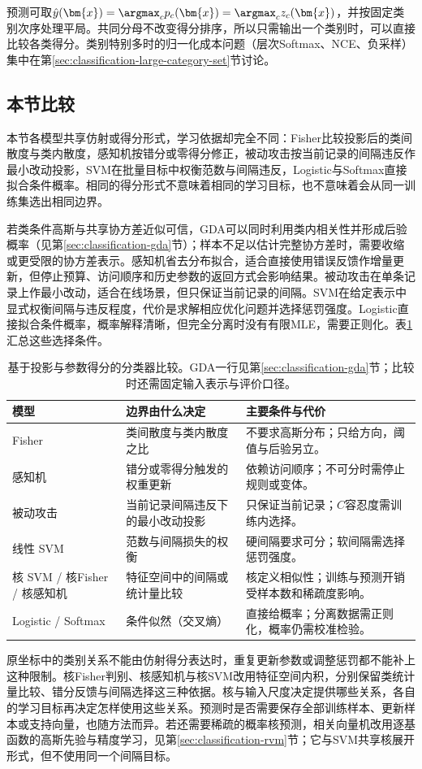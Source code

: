 预测可取$\hat y(\bm{x})=\argmax_c p_c(\bm{x})=\argmax_c z_c(\bm{x})$，并按固定类别次序处理平局。共同分母不改变得分排序，所以只需输出一个类别时，可以直接比较各类得分。类别特别多时的归一化成本问题（层次Softmax、NCE、负采样）集中在第\ref{sec:classification-large-category-set}节讨论。

\subsection{本节比较}
\label{sec:classification-linear-comparison}

本节各模型共享仿射或得分形式，学习依据却完全不同：Fisher比较投影后的类间散度与类内散度，感知机按错分或零得分修正，被动攻击按当前记录的间隔违反作最小改动投影，SVM在批量目标中权衡范数与间隔违反，Logistic与Softmax直接拟合条件概率。相同的得分形式不意味着相同的学习目标，也不意味着会从同一训练集选出相同边界。

若类条件高斯与共享协方差近似可信，GDA可以同时利用类内相关性并形成后验概率（见第\ref{sec:classification-gda}节）；样本不足以估计完整协方差时，需要收缩或更受限的协方差表示。感知机省去分布拟合，适合直接使用错误反馈作增量更新，但停止预算、访问顺序和历史参数的返回方式会影响结果。被动攻击在单条记录上作最小改动，适合在线场景，但只保证当前记录的间隔。SVM在给定表示中显式权衡间隔与违反程度，代价是求解相应优化问题并选择惩罚强度。Logistic直接拟合条件概率，概率解释清晰，但完全分离时没有有限MLE，需要正则化。表\ref{tab:classification-linear-comparison}汇总这些选择条件。

\begin{table}[htbp]
  \centering
  \small
  \begin{tabularx}{\linewidth}{@{}>{\RaggedRight\arraybackslash}p{18mm}>{\RaggedRight\arraybackslash}X>{\RaggedRight\arraybackslash}X@{}}
    \toprule
    模型 & 边界由什么决定 & 主要条件与代价 \\
    \midrule
    Fisher & 类间散度与类内散度之比 & 不要求高斯分布；只给方向，阈值与后验另立。 \\
    感知机 & 错分或零得分触发的权重更新 & 依赖访问顺序；不可分时需停止规则或变体。 \\
    被动攻击 & 当前记录间隔违反下的最小改动投影 & 只保证当前记录；$C$容忍度需训练内选择。 \\
    线性 SVM & 范数与间隔损失的权衡 & 硬间隔要求可分；软间隔需选择惩罚强度。 \\
    核 SVM / 核Fisher / 核感知机 & 特征空间中的间隔或统计量比较 & 核定义相似性；训练与预测开销受样本数和稀疏度影响。 \\
    Logistic / Softmax & 条件似然（交叉熵） & 直接给概率；分离数据需正则化，概率仍需校准检验。 \\
    \bottomrule
  \end{tabularx}
  \caption{基于投影与参数得分的分类器比较。GDA一行见第\ref{sec:classification-gda}节；比较时还需固定输入表示与评价口径。}
  \label{tab:classification-linear-comparison}
\end{table}

原坐标中的类别关系不能由仿射得分表达时，重复更新参数或调整惩罚都不能补上这种限制。核Fisher判别、核感知机与核SVM改用特征空间内积，分别保留类统计量比较、错分反馈与间隔选择这三种依据。核与输入尺度决定提供哪些关系，各自的学习目标再决定怎样使用这些关系。预测时是否需要保存全部训练样本、更新样本或支持向量，也随方法而异。若还需要稀疏的概率核预测，相关向量机改用逐基函数的高斯先验与精度学习，见第\ref{sec:classification-rvm}节；它与SVM共享核展开形式，但不使用同一个间隔目标。
